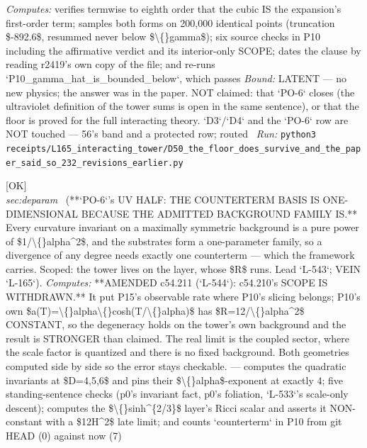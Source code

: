 \begin{description}
\emph{Computes:} verifies termwise to eighth order that the cubic IS the expansion's first-order term; samples both forms on 200,000 identical points (truncation \$-892.6\$, resummed never below \$\textbackslash\{\}gamma\$); six source checks in P10 including the affirmative verdict and its interior-only SCOPE; dates the clause by reading r2419's own copy of the file; and re-runs `P10\_gamma\_hat\_is\_bounded\_below`, which passes
 \emph{Bound:} LATENT --- no new physics; the answer was in the paper. NOT claimed: that `PO-6` closes (the ultraviolet definition of the tower sums is open in the same sentence), or that the floor is proved for the full interacting theory.  `D3`/`D4` and the `PO-6` row are NOT touched --- 56's band and a protected row; routed
\ \emph{Run:} \texttt{python3 receipts/L165\_interacting\_tower/D50\_the\_floor\_does\_survive\_and\_the\_paper\_said\_so\_232\_revisions\_earlier.py}
\item[\label{rcpt:S50_the_counterterm_basis_is_one_dimensional_because_the_background_family_is}\textbf{}\quad\texttt{S50\_the\_counterterm\_basis\_is\_one\_dimensional\_because\_the\_background\_family\_is}]\hfill\textsf{[OK]}\\
\textit{sec:deparam} \ (**`PO-6`'s UV HALF: THE COUNTERTERM BASIS IS ONE-DIMENSIONAL BECAUSE THE ADMITTED BACKGROUND FAMILY IS.** Every curvature invariant on a maximally symmetric background is a pure power of \$1/\textbackslash\{\}alpha\textasciicircum{}2\$, and the substrates form a one-parameter family, so a divergence of any degree needs exactly one counterterm --- which the framework carries.  Scoped: the tower lives on the layer, whose \$R\$ runs. Lead `L-543`; VEIN `L-165`). 
\emph{Computes:}  **AMENDED c54.211 (`L-544`): c54.210's SCOPE IS WITHDRAWN.** It put P15's observable rate where P10's slicing belongs; P10's own \$a(T)=\textbackslash\{\}alpha\textbackslash\{\}cosh(T/\textbackslash\{\}alpha)\$ has \$R=12/\textbackslash\{\}alpha\textasciicircum{}2\$ CONSTANT, so the degeneracy holds on the tower's own background and the result is STRONGER than claimed. The real limit is the coupled sector, where the scale factor is quantized and there is no fixed background. Both geometries computed side by side so the error stays checkable. --- computes the quadratic invariants at \$D=4,5,6\$ and pins their \$\textbackslash\{\}alpha\$-exponent at exactly 4; five standing-sentence checks (p0's invariant fact, p0's foliation, `L-533`'s scale-only descent); computes the \$\textbackslash\{\}sinh\textasciicircum{}\{2/3\}\$ layer's Ricci scalar and asserts it NON-constant with a \$12H\textasciicircum{}2\$ late limit; and counts `counterterm` in P10 from git HEAD (0) against now (7)

\end{description}
